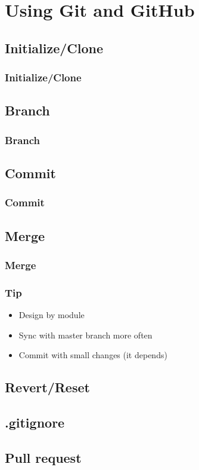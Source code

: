 \documentclass{beamer}
\begin{document}
	\section{Using Git and GitHub}
		\subsection{Initialize/Clone}
			\begin{frame}
				\frametitle{Initialize/Clone}


			\end{frame}

		\subsection{Branch}
			\begin{frame}
				\frametitle{Branch}
			\end{frame}

		\subsection{Commit}
			\begin{frame}
				\frametitle{Commit}
			\end{frame}

		\subsection{Merge}
			\begin{frame}
				\frametitle{Merge}
			\end{frame}

			\begin{frame}
				\frametitle{Tip}
				\begin{itemize}
					\item Design by module
					\item Sync with master branch more often
					\item Commit with small changes (it depends)
				\end{itemize}
			\end{frame}

		\subsection{Revert/Reset}

		\subsection{.gitignore}

		\subsection{Pull request}
\end{document}
